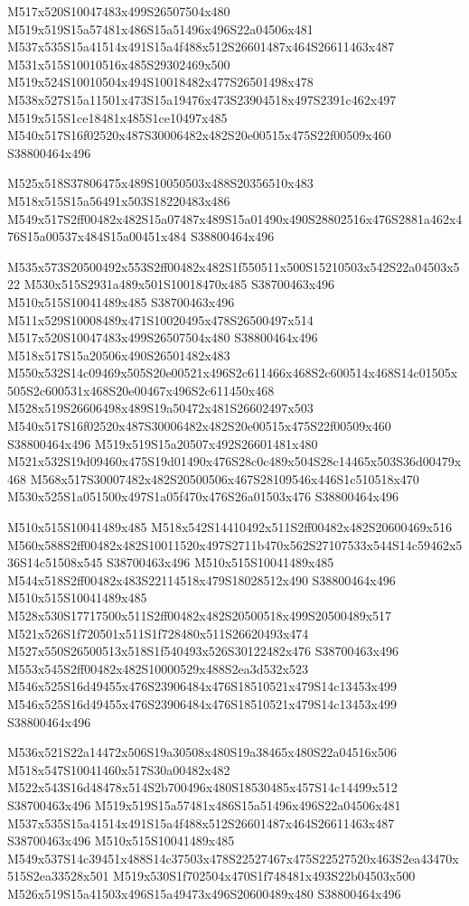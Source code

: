 \documentclass{article}
\begin{document}
\begin{multicols}{2}
M517x520S10047483x499S26507504x480 M519x519S15a57481x486S15a51496x496S22a04506x481 M537x535S15a41514x491S15a4f488x512S26601487x464S26611463x487 M531x515S10010516x485S29302469x500 M519x524S10010504x494S10018482x477S26501498x478 M538x527S15a11501x473S15a19476x473S23904518x497S2391c462x497 M519x515S1ce18481x485S1ce10497x485 M540x517S16f02520x487S30006482x482S20e00515x475S22f00509x460 S38800464x496

M525x518S37806475x489S10050503x488S20356510x483 M518x515S15a56491x503S18220483x486 M549x517S2ff00482x482S15a07487x489S15a01490x490S28802516x476S2881a462x476S15a00537x484S15a00451x484 S38800464x496

M535x573S20500492x553S2ff00482x482S1f550511x500S15210503x542S22a04503x522 M530x515S2931a489x501S10018470x485 S38700463x496 M510x515S10041489x485 S38700463x496 M511x529S10008489x471S10020495x478S26500497x514 M517x520S10047483x499S26507504x480 S38800464x496 M518x517S15a20506x490S26501482x483 M550x532S14c09469x505S20e00521x496S2c611466x468S2c600514x468S14c01505x505S2c600531x468S20e00467x496S2c611450x468 M528x519S26606498x489S19a50472x481S26602497x503 M540x517S16f02520x487S30006482x482S20e00515x475S22f00509x460 S38800464x496 M519x519S15a20507x492S26601481x480 M521x532S19d09460x475S19d01490x476S28c0c489x504S28c14465x503S36d00479x468 M568x517S30007482x482S20500506x467S28109546x446S1c510518x470 M530x525S1a051500x497S1a05f470x476S26a01503x476 S38800464x496

M510x515S10041489x485 M518x542S14410492x511S2ff00482x482S20600469x516 M560x588S2ff00482x482S10011520x497S2711b470x562S27107533x544S14c59462x536S14c51508x545 S38700463x496 M510x515S10041489x485 M544x518S2ff00482x483S22114518x479S18028512x490 S38800464x496 M510x515S10041489x485 M528x530S17717500x511S2ff00482x482S20500518x499S20500489x517 M521x526S1f720501x511S1f728480x511S26620493x474 M527x550S26500513x518S1f540493x526S30122482x476 S38700463x496 M553x545S2ff00482x482S10000529x488S2ea3d532x523 M546x525S16d49455x476S23906484x476S18510521x479S14c13453x499 M546x525S16d49455x476S23906484x476S18510521x479S14c13453x499 S38800464x496

M536x521S22a14472x506S19a30508x480S19a38465x480S22a04516x506 M518x547S10041460x517S30a00482x482 M522x543S16d48478x514S2b700496x480S18530485x457S14c14499x512 S38700463x496 M519x519S15a57481x486S15a51496x496S22a04506x481 M537x535S15a41514x491S15a4f488x512S26601487x464S26611463x487 S38700463x496 M510x515S10041489x485 M549x537S14c39451x488S14c37503x478S22527467x475S22527520x463S2ea43470x515S2ea33528x501 M519x530S1f702504x470S1f748481x493S22b04503x500 M526x519S15a41503x496S15a49473x496S20600489x480 S38800464x496


\end{multicols}
\end{document}
